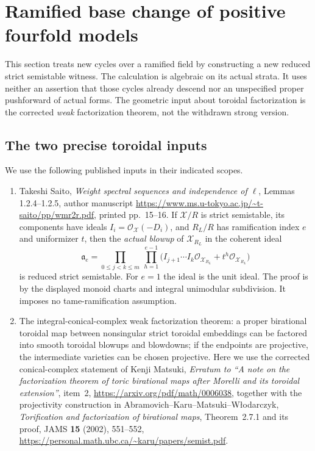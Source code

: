 \section{Ramified base change of positive fourfold models}
\label{r18rb:section}

This section treats new cycles over a ramified field by constructing a
new reduced strict semistable witness.  The calculation is algebraic on
its actual strata.  It uses neither an assertion that those cycles
already descend nor an unspecified proper pushforward of actual forms.
The geometric input about toroidal factorization is the corrected
\emph{weak} factorization theorem, not the withdrawn strong version.

\subsection{The two precise toroidal inputs}

We use the following published inputs in their indicated scopes.
\begin{enumerate}
\item Takeshi Saito, \emph{Weight spectral sequences and independence
of $\ell$}, Lemmas 1.2.4--1.2.5, author manuscript
\url{https://www.ms.u-tokyo.ac.jp/~t-saito/pp/wmr2r.pdf},
printed pp.~15--16.  If $\mathcal X/R$ is strict semistable, its
components have ideals $I_i=\mathcal O_{\mathcal X}(-D_i)$,
and $R_L/R$ has ramification index $e$ and uniformizer $t$, then the
\emph{actual blowup} of $\mathcal X_{R_L}$ in the coherent ideal
\[
 \mathfrak a_e=
 \prod_{0\le j<k\le m}\ \prod_{h=1}^{e-1}
       \bigl(I_{j+1}\cdots I_k\mathcal O_{\mathcal X_{R_L}}
                      +t^h\mathcal O_{\mathcal X_{R_L}}\bigr)
 \tag{RB18.1}\label{r18rb:saito-ideal}
\]
is reduced strict semistable.  For $e=1$ the ideal is the unit ideal.
The proof is by the displayed monoid charts and integral unimodular
subdivision.  It imposes no tame-ramification assumption.

\item The integral-conical-complex weak factorization theorem:
a proper birational toroidal map between nonsingular strict toroidal
embeddings can be factored into smooth toroidal blowups and blowdowns;
if the endpoints are projective, the intermediate varieties can be
chosen projective.  Here we use the corrected conical-complex statement
of Kenji Matsuki, \emph{Erratum to ``A note on the factorization theorem
of toric birational maps after Morelli and its toroidal extension''},
item~2, \url{https://arxiv.org/pdf/math/0006038}, together with the
projectivity construction in Abramovich--Karu--Matsuki--W\l odarczyk,
\emph{Torification and factorization of birational maps},
Theorem~2.7.1 and its proof, JAMS \textbf{15} (2002), 551--552,
\url{https://personal.math.ubc.ca/~karu/papers/semist.pdf}.
\end{enumerate}

